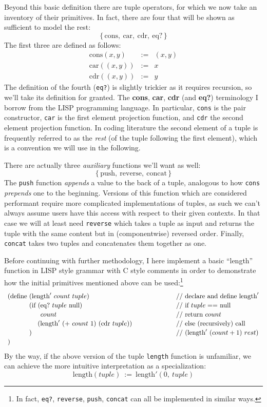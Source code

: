 \documentclass[twoside]{article}
\newcommand{\strong}[1]{{\bfseries #1}}
\newcommand{\tab}[1][1.125cm]{\hspace{#1}}
\newcommand{\col}[1][0ex]{& \hspace{#1}}
\newcommand{\cbox}[1]{\mbox{// #1}}
\newcommand{\cons}{\mbox{cons}}
\newcommand{\car}{\mbox{car}}
\newcommand{\cdr}{\mbox{cdr}}
\newcommand{\eq}{\mbox{eq?}}
\newcommand{\length}{\mbox{length}}
\newcommand{\push}{\mbox{push}}
\newcommand{\rev}{\mbox{reverse}}
\newcommand{\concat}{\mbox{concat}}
\newcommand{\define}{\mbox{define}}
\begin{document}
Beyond this basic definition there are tuple operators, for which we now take an inventory of their primitives.
In fact, there are four that will be shown as sufficient to model the rest:
$$ \{\,\cons,\ \car,\ \cdr,\ \eq\,\} $$
The first three are defined as follows:
$$ \begin{array}{lcl}
\cons(x, y)		& := & (x, y)			\\
\car((x, y))		& := & x			\\
\cdr((x, y))		& := & y
\end{array} $$
The definition of the fourth (\texttt{eq?}) is slightly trickier as it requires recursion, so we'll take its definition
for granted. The \strong{cons}, \strong{car}, \strong{cdr} (and \strong{eq?}) terminology I borrow from the LISP programming
language. In particular, \texttt{cons} is the pair constructor, \texttt{car} is the first element projection function,
and \texttt{cdr} the second element projection function. In coding literature the second element of a tuple is frequently
referred to as the \emph{rest} (of the tuple following the first element), which is a convention we will use in the following.

There are actually three \emph{auxiliary} functions we'll want as well:
$$ \{\,\push,\ \rev,\ \concat\,\} $$
The \texttt{push} function \emph{appends} a value to the back of a tuple, analogous to how \texttt{cons} \emph{prepends}
one to the beginning. Versions of this function which are considered performant require more complicated implementations
of tuples, as such we can't always assume users have this access with respect to their given contexts. In that case we
will at least need \texttt{reverse} which takes a tuple as input and returns the tuple with the same content but in
(componentwise) reversed order. Finally, \texttt{concat} takes two tuples and concatenates them together as one.

Before continuing with further methodology, I here implement a basic ``length'' function in LISP style grammar with C style
comments in order to demonstrate how the initial primitives mentioned above can be used:\footnote{In fact, \texttt{eq?},
\texttt{reverse}, \texttt{push}, \texttt{concat} can all be implemented in similar ways.}
$$ \def\arraystretch{1.15}
\tab[0cm] \begin{array}{ll}
(\define\ (\length'\ count\ tuple)				\col[2cm] \cbox{declare and define length}'		\\
\tab[1.15cm] (\mbox{if}\ (\eq\ tuple\ \mbox{null})		\col[2cm] \cbox{if $tuple == $ null}			\\
\tab[1.75cm]  count						\col[2cm] \cbox{return } count				\\
\tab[1.60cm]  (\length'\ (+\ count\ 1)\ (\cdr\ tuple))		\col[2cm] \cbox{else (recursively) call}		\\
\tab[1.15cm] )							\col[2cm] //\ (\length'\ (count + 1)\ rest)		\\
)
\end{array} $$
By the way, if the above version of the tuple \texttt{length} function is unfamiliar,
we can achieve the more intuitive interpretation as a specialization:
$$ \mbox{length}(tuple)\ :=\ \mbox{length}'(0,\ tuple) $$
\end{document}
